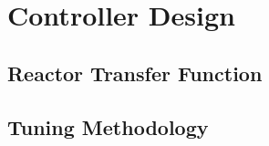 \chapter{Controller Design}
\label{Chapter:Design}

\section{Reactor Transfer Function}

\section{Tuning Methodology}

